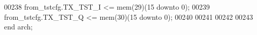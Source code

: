 \begin{DoxyCode}
00238    \textcolor{vhdlchar}{from_tstcfg}\textcolor{vhdlchar}{.}\textcolor{vhdlchar}{TX_TST_I}      \textcolor{vhdlchar}{<=} \textcolor{vhdlchar}{mem}\textcolor{vhdlchar}{(}\textcolor{vhdllogic}{}\textcolor{vhdllogic}{29}\textcolor{vhdlchar}{)}\textcolor{vhdlchar}{(}\textcolor{vhdllogic}{}\textcolor{vhdllogic}{15} \textcolor{keywordflow}{downto} \textcolor{vhdllogic}{}\textcolor{vhdllogic}{0}\textcolor{vhdlchar}{)};
00239    \textcolor{vhdlchar}{from_tstcfg}\textcolor{vhdlchar}{.}\textcolor{vhdlchar}{TX_TST_Q}      \textcolor{vhdlchar}{<=} \textcolor{vhdlchar}{mem}\textcolor{vhdlchar}{(}\textcolor{vhdllogic}{}\textcolor{vhdllogic}{30}\textcolor{vhdlchar}{)}\textcolor{vhdlchar}{(}\textcolor{vhdllogic}{}\textcolor{vhdllogic}{15} \textcolor{keywordflow}{downto} \textcolor{vhdllogic}{}\textcolor{vhdllogic}{0}\textcolor{vhdlchar}{)};
00240 
00241 
00242 
00243 \textcolor{keywordflow}{end} \textcolor{vhdlchar}{arch};
\end{DoxyCode}

